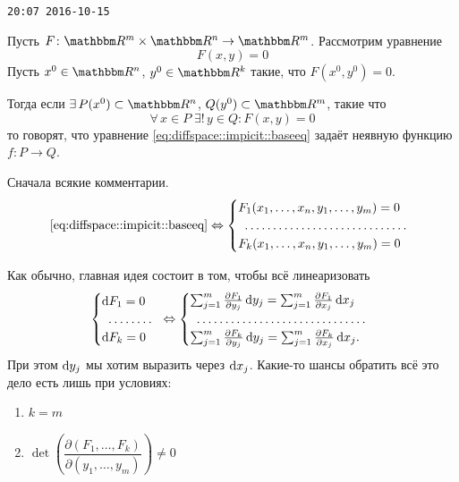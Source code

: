\documentclass[12pt,trimbord]{../../../notes}
\begin{document}
\verb+20:07 2016-10-15+

\begin{defn}\label{defn:diffspace::implicit}
  Пусть $F \colon \R^m\times\R^n \to \R^m$. Рассмотрим уравнение
  \begin{equation}
    F(x, y) = 0
    \label{eq:diffspace::impicit::baseeq}
  \end{equation}
  Пусть $x^0\in \R^n$, $y^0\in \R^k$ такие, что $F(x^0, y^0) = 0$.
 
  Тогда если $\exists\,P(x^0) \subset \R^n$, $Q(y^0) \subset \R^m$, такие что
  \[
    \forall\, x\in P \; \exists!\, y\in Q \colon F(x,y) = 0
  \]
  то говорят, что уравнение \eqref{eq:diffspace::impicit::baseeq} задаёт неявную функцию 
  $f\colon P \to Q$.
\end{defn}

Сначала всякие комментарии.
\begin{equation*}
  \text{\eqref{eq:diffspace::impicit::baseeq}} \Leftrightarrow
  \begin{cases}
    F_1(x_1, \dotsc, x_n, y_1, \dotsc, y_m) = 0 \\
    \hdotsfor{1}\\
    F_k(x_1, \dotsc, x_n, y_1, \dotsc, y_m) = 0 \\
  \end{cases}
\end{equation*}

Как обычно, главная идея состоит в том, чтобы всё линеаризовать
\begin{equation}
  \begin{cases}
    \del F_1 = 0 \\
    \hdotsfor{1}\\
    \del F_k = 0 \\
  \end{cases}
  \Leftrightarrow 
  \begin{cases}
    \sum_{j=1}^m \frac{\partial F_1}{\partial y_j}\, \del y_j = 
    \sum_{j=1}^m \frac{\partial F_1}{\partial x_j}\, \del x_j \\
    \hdotsfor{1}\\
    \sum_{j=1}^m \frac{\partial F_k}{\partial y_j}\, \del y_j = 
    \sum_{j=1}^m \frac{\partial F_k}{\partial x_j}\, \del x_j .\\
  \end{cases}\nolinebreak\label{eq:diffspace::impicit::diff}
\end{equation}
При этом $\mathrm{d} y_j$ мы хотим выразить через $\mathrm{d} x_j$.
Какие-то шансы обратить всё это дело есть лишь при условиях:
\begin{enumerate}
  \item $k=m$
  \item $\det \left(\dfrac{\partial(F_1, \dotsc, F_k)}{\partial(y_1, \dotsc, y_m)}\right) \neq 0$
\end{enumerate}
\end{document}
